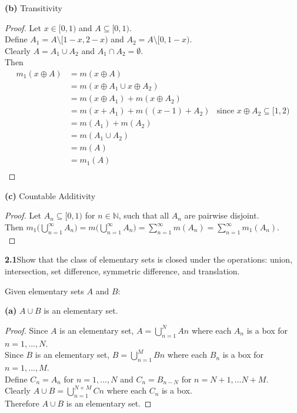 \documentclass[12pt]{article}
\begin{document}
\hspace{-4 ex}\textbf{(b)} Transitivity

\begin{proof}
	Let $x \in [0,1)$ and $ A \subseteq [0,1)$. \\
	Define $A_{1}= A \setminus [1-x,2-x)$ and $A_{2} = A \setminus [0, 1-x)$. \\
	Clearly $A = A_{1} \cup A_{2}$ and $A_{1} \cap A_{2} = \emptyset$. \\
	Then 
	\begin{align*}
		m_{1}(x \oplus A) & = m(x \oplus A) \\
		& = m(x \oplus A_{1} \cup x \oplus A_{2}) \\
		& = m(x \oplus A_{1}) + m(x \oplus A_{2}) \\
		& = m(x + A_{1}) + m( (x-1) + A_{2}) & \text{since } x \oplus A_{2} \subseteq [1,2) \\
		& = m(A_{1}) + m(A_{2}) \\
		& = m(A_{1} \cup A_{2}) \\
		& = m(A) \\
		& = m_{1}(A) \\
	\end{align*} 
\end{proof}

\hspace{-4 ex}\textbf{(c)} Countable Additivity \\

\begin{proof}
	Let $A_{n} \subseteq [0,1)$ for $n \in \mathbb{N}$, such that all $A_{n}$ are pairwise disjoint. \\
	Then $m_{1}\big(\bigcup\limits_{n=1}^{\infty}A_{n}\big) = m \big(\bigcup\limits_{n=1}^{\infty}A_{n}\big) = \sum\limits_{n=1}^{\infty}m(A_{n}) = \sum\limits_{n=1}^{\infty}m_{1}(A_{n})$.\\
\end{proof}


\bigbreak

	\hspace{-4 ex}\textbf{2.1}Show that the class of elementary sets is closed under the operations: union, intersection, set difference, symmetric difference, and translation. \bigbreak
	
	Given elementary sets $A$ and $B$: \bigbreak
	
	\hspace{-4 ex}\textbf{(a)} $A \cup B$ is an elementary set.
	
	
	\begin{proof}
		Since $A$ is an elementary set, $A = \bigcup_{n=1}^{N} A{n}$ where each $A_{n}$ is a box for $n=1,...,N$. \\
		Since $B$ is an elementary set, $B = \bigcup_{n=1}^{M} B{n}$ where each $B_{n}$ is a box for $n=1,...,M$. \\
		Define $C_{n} = A_{n}$ for $n=1,...,N$ and $C_{n} = B_{n-N}$ for $n=N+1,...N+M$. \\
		Clearly $A \cup B = \bigcup_{n=1}^{N+M} C{n}$ where each $C_{n}$ is a box. \\
		Therefore $A \cup B$ is an elementary set.
	\end{proof}
\end{document}

